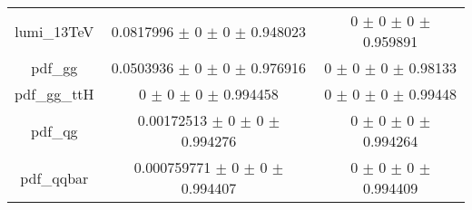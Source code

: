 \begin{table}
\begin{tabular}{ccc}
lumi\_13TeV & \num{0.0817996} $\pm$ \num{0} $\pm$ \num{0} $\pm$ \num{0.948023} & \num{0} $\pm$ \num{0} $\pm$ \num{0} $\pm$ \num{0.959891}\\
pdf\_gg & \num{0.0503936} $\pm$ \num{0} $\pm$ \num{0} $\pm$ \num{0.976916} & \num{0} $\pm$ \num{0} $\pm$ \num{0} $\pm$ \num{0.98133}\\
pdf\_gg\_ttH & \num{0} $\pm$ \num{0} $\pm$ \num{0} $\pm$ \num{0.994458} & \num{0} $\pm$ \num{0} $\pm$ \num{0} $\pm$ \num{0.99448}\\
pdf\_qg & \num{0.00172513} $\pm$ \num{0} $\pm$ \num{0} $\pm$ \num{0.994276} & \num{0} $\pm$ \num{0} $\pm$ \num{0} $\pm$ \num{0.994264}\\
pdf\_qqbar & \num{0.000759771} $\pm$ \num{0} $\pm$ \num{0} $\pm$ \num{0.994407} & \num{0} $\pm$ \num{0} $\pm$ \num{0} $\pm$ \num{0.994409}\\
\bottomrule
\end{tabular}
\end{table}
